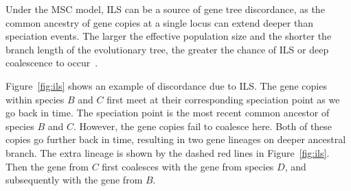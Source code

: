 Under the MSC model, ILS can be a source of gene tree discordance, as the common ancestry of gene copies at a single locus can extend deeper than speciation events. The larger the effective population size and the shorter the branch length of the evolutionary tree, the greater the chance of ILS or deep coalescence to occur~\cite{maddison1997gene}.

Figure~\ref{fig:ils} shows an example of discordance due to ILS. The gene copies within species $B$ and $C$ first meet at their corresponding speciation point as we go back in time. The speciation point is the most recent common ancestor of species $B$ and $C$. However, the gene copies fail to coalesce here. Both of these copies go further back in time, resulting in two gene lineages on deeper ancestral branch. The extra lineage is shown by the dashed red lines in Figure~\ref{fig:ils}. Then the gene from $C$ first coalesces with the gene from species $D$, and subsequently with the gene from $B$.

